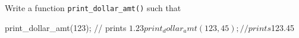 Write a function \texttt{print\_dollar\_amt()} such that



\begin{consolethree}[escapeinside=||]

print_dollar_amt(123);     // prints $1.23

print_dollar_amt(123, 45); // prints $123.45

\end{consolethree}

